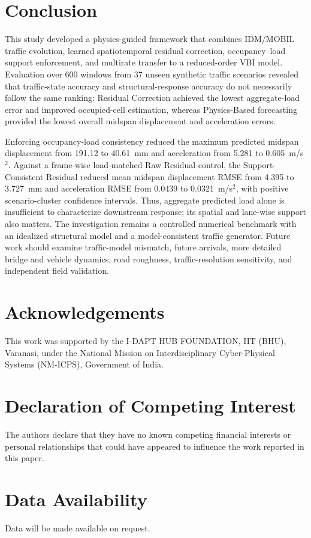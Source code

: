 \documentclass[journal]{IEEEtran}
\begin{document}
\FloatBarrier

\section{Conclusion}

This study developed a physics-guided framework that combines IDM/MOBIL traffic evolution, learned spatiotemporal residual correction, occupancy--load support enforcement, and multirate transfer to a reduced-order VBI model. Evaluation over 600 windows from 37 unseen synthetic traffic scenarios revealed that traffic-state accuracy and structural-response accuracy do not necessarily follow the same ranking: Residual Correction achieved the lowest aggregate-load error and improved occupied-cell estimation, whereas Physics-Based forecasting provided the lowest overall midspan displacement and acceleration errors.

Enforcing occupancy-load consistency reduced the maximum predicted midspan displacement from 191.12 to 40.61~mm and acceleration from 5.281 to 0.605~m/s$^2$. Against a frame-wise load-matched Raw Residual control, the Support-Consistent Residual reduced mean midspan displacement RMSE from 4.395 to 3.727~mm and acceleration RMSE from 0.0439 to 0.0321~m/s$^2$, with positive scenario-cluster confidence intervals. Thus, aggregate predicted load alone is insufficient to characterize downstream response; its spatial and lane-wise support also matters. The investigation remains a controlled numerical benchmark with an idealized structural model and a model-consistent traffic generator. Future work should examine traffic-model mismatch, future arrivals, more detailed bridge and vehicle dynamics, road roughness, traffic-resolution sensitivity, and independent field validation.

\section*{Acknowledgements}

This work was supported by the I-DAPT HUB FOUNDATION,
IIT (BHU), Varanasi, under the National Mission on
Interdisciplinary Cyber-Physical Systems (NM-ICPS),
Government of India.

\section*{Declaration of Competing Interest}

The authors declare that they have no known competing
financial interests or personal relationships that could
have appeared to influence the work reported in this paper.

\section*{Data Availability}

Data will be made available on request.

\FloatBarrier





\end{document}
